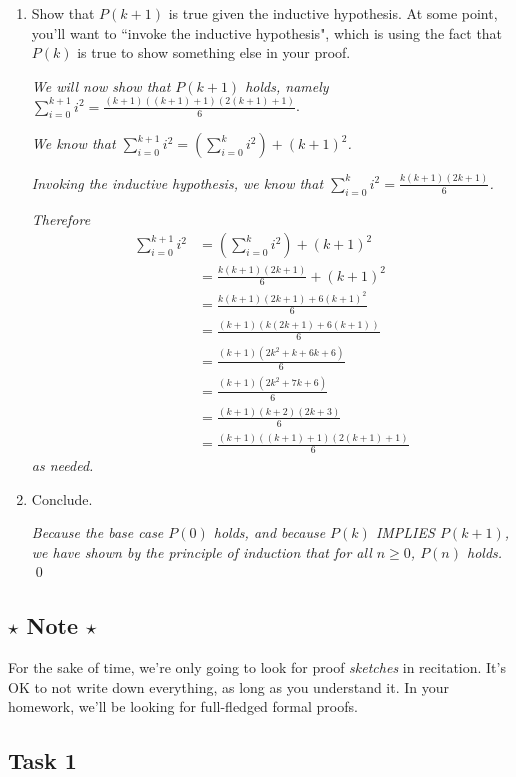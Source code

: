 \documentclass[12pt,letterpaper]{article}
\begin{document}
\begin{enumerate}
        \item Show that $P(k+1)$ is true given the inductive hypothesis. At some point, you'll want to ``invoke the inductive hypothesis", which is using the fact that $P(k)$ is true to show something else in your proof.

		\textit{We will now show that $P(k+1)$ holds, namely  $\sum_{i=0}^{k+1} i^2 = \frac{(k+1)((k+1)+1)(2(k+1)+1)}{6}$}.

       	\textit{We know that $\sum_{i=0}^{k+1} i^2 = \left( \sum_{i=0}^{k} i^2 \right)+ (k+1)^2$.}

		\textit{Invoking the inductive hypothesis, we know that $\sum_{i=0}^k i^2 = \frac{k(k+1)(2k+1)}{6}$.}

         \textit{Therefore}
		\begin{align*}
			\sum_{i=0}^{k+1} i^2 &= \left( \sum_{i=0}^{k} i^2 \right)+ (k+1)^2 \\
			&=  \frac{k(k+1)(2k+1)}{6} + (k+1)^2 \\
			&= \frac{k(k+1)(2k+1) + 6(k+1)^2}{6} \\
			&= \frac{(k+1)(k(2k+1)+6(k+1))}{6} \\
			&= \frac{(k+1)(2k^2+k+6k+6)}{6} \\
			&= \frac{(k+1)(2k^2+7k+6)}{6} \\
			&= \frac{(k+1)(k+2)(2k+3)}{6} \\
			&= \frac{(k+1)((k+1)+1)(2(k+1)+1)}{6}
		\end{align*}
		\textit{as needed.}
		
		 \item Conclude.
		 
		 \textit{Because the base case $P(0)$ holds, and because $P(k)$ IMPLIES $P(k + 1)$, we have shown by the principle of induction that for all $n \geq 0$, $P(n)$ holds.} \qed
		\end{enumerate}

\subsection*{$\star$ Note $\star$}

For the sake of time, we're only going to look for proof \textit{sketches} in recitation. It's OK to not write down everything, as long as you understand it. In your homework, we'll be looking for full-fledged formal proofs.

	\subsection*{Task 1}
\end{document}
